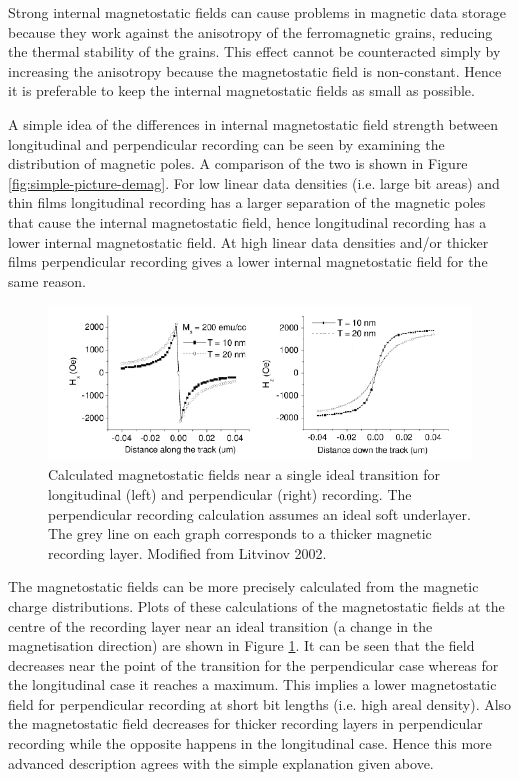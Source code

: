 Strong internal magnetostatic fields can cause problems in magnetic data storage
because they work against the anisotropy of the ferromagnetic grains, reducing
the thermal stability of the grains. This effect cannot be counteracted simply
by increasing the anisotropy because the magnetostatic field is
non-constant. Hence it is preferable to keep the internal magnetostatic fields
as small as possible.

A simple idea of the differences in internal magnetostatic field strength between
longitudinal and perpendicular recording can be seen by examining the
distribution of magnetic poles. A comparison of the two is shown in Figure
\ref{fig:simple-picture-demag}. For low linear data densities (i.e. large bit areas)
and thin films longitudinal recording has a larger separation of the magnetic
poles that cause the internal magnetostatic field, hence longitudinal recording has a
lower internal magnetostatic field. At high linear data densities and/or thicker films
perpendicular recording gives a lower internal magnetostatic field for the same
reason.\cite{Piramanayagam2007a}

\begin{figure}[!ht]
  \center
  \includegraphics[width=1\textwidth]{./images/perpvslongdemags}
  \caption{Calculated magnetostatic fields near a single ideal transition for
    longitudinal (left) and perpendicular (right) recording. The perpendicular
    recording calculation assumes an ideal soft underlayer. The grey line on each
    graph corresponds to a thicker magnetic recording layer. Modified from Litvinov
    2002\cite{Litvinov2002}.}
  \label{fig:Calculated-demagnetising-fields}
\end{figure}

The magnetostatic fields can be more precisely calculated from the magnetic
charge distributions. Plots of these calculations of the magnetostatic fields at
the centre of the recording layer near an ideal transition (a change in the
magnetisation direction) are shown in Figure
\ref{fig:Calculated-demagnetising-fields}. It can be seen that the field
decreases near the point of the transition for the perpendicular case whereas
for the longitudinal case it reaches a maximum. This implies a lower
magnetostatic field for perpendicular recording at short bit lengths (i.e. high
areal density). Also the magnetostatic field decreases for thicker recording
layers in perpendicular recording while the opposite happens in the longitudinal
case. Hence this more advanced description agrees with the simple explanation
given above.\cite{Litvinov2002}

